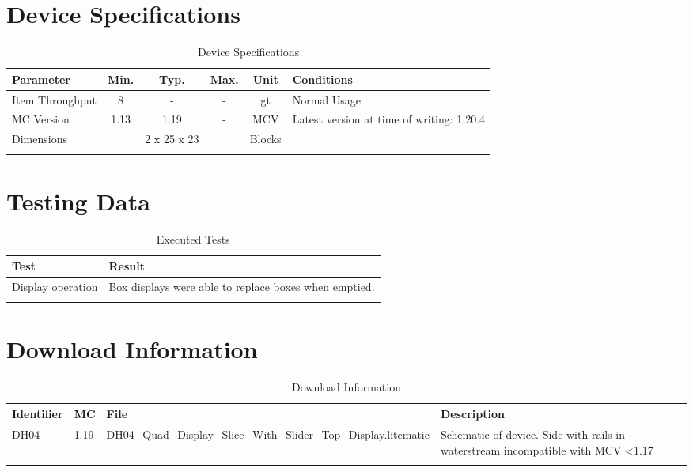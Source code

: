 \documentclass[10pt]{datasheet}
\begin{document}
\onecolumn

\section{Device Specifications}

\begin{table}[H]
    \caption{Device Specifications}
    \begin{tabularx}{\textwidth}{l | c c c | c | X}
        \thickhline
        \textbf{Parameter} & \textbf{Min.} & \textbf{Typ.} & \textbf{Max.} &
        \textbf{Unit} & \textbf{Conditions} \\
        \hline
        Item Throughput  & 8 & - & - & gt & Normal Usage \\
        \hline
        MC Version & 1.13 & 1.19 & - & MCV & Latest version at time of writing: 1.20.4\\
        \hline
        Dimensions & & 2 x 25 x 23 & & Blocks & \\
        \thickhline
\end{tabularx}
\end{table}
\section{Testing Data}
\begin{table}[H]
\caption{Executed Tests}
\begin{tabularx}{\textwidth}{l | X}
    \thickhline
    \textbf{Test} & \textbf{Result} \\
    \hline
    Display operation & Box displays were able to replace boxes when emptied. \\
    \thickhline
\end{tabularx}
\end{table}

\section{Download Information}
\begin{table}[H]
    \caption{Download Information}
    \begin{tabularx}{\textwidth}{l | l | l | X}
        \thickhline
        \textbf{Identifier} & \textbf{MC} & \textbf{File} & \textbf{Description} \\
        \hline
        DH04 & 1.19 & \href{https://github.com/Soontech-Annals/Archive/blob/b56572c0d2b4f182d9e9d41449d8cb2963b923ae/Archive/display-halls/DH04\%20Quad\%20Display\%20Slice\%20With\%20Slider\%20Top\%20Display/DH04\_Quad\_Display\_Slice\_With\_Slider\_Top\_Display.litematic?raw=1}{DH04\_Quad\_Display\_Slice\_With\_Slider\_Top\_Display.litematic} & Schematic of device. Side with rails in waterstream incompatible with MCV \textless 1.17\\
        \hline
        \thickhline
    \end{tabularx}
\end{table}
\end{document}
